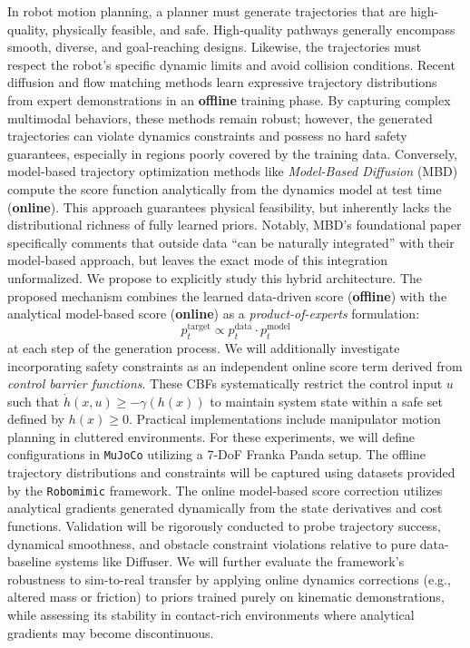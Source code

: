 \documentclass[letterpaper, 10 pt, conference]{ieeeconf}  %
\begin{document}
In robot motion planning, a planner must generate trajectories that are high-quality, physically feasible, and safe. High-quality pathways generally encompass smooth, diverse, and goal-reaching designs. Likewise, the trajectories must respect the robot's specific dynamic limits and avoid collision conditions. Recent diffusion and flow matching methods learn expressive trajectory distributions from expert demonstrations in an \textbf{offline} training phase. By capturing complex multimodal behaviors, these methods remain robust; however, the generated trajectories can violate dynamics constraints and possess no hard safety guarantees, especially in regions poorly covered by the training data. Conversely, model-based trajectory optimization methods like \textit{Model-Based Diffusion} (MBD) \cite{mbd} compute the score function analytically from the dynamics model at test time (\textbf{online}). This approach guarantees physical feasibility, but inherently lacks the distributional richness of fully learned priors. Notably, MBD's foundational paper specifically comments that outside data ``can be naturally integrated'' with their model-based approach, but leaves the exact mode of this integration unformalized. We propose to explicitly study this hybrid architecture. The proposed mechanism combines the learned data-driven score (\textbf{offline}) with the analytical model-based score (\textbf{online}) as a \textit{product-of-experts} formulation:
$$
    p^{\mathrm{target}}_t \propto p^{\mathrm{data}}_t \cdot p^{\mathrm{model}}_t
$$
at each step of the generation process. We will additionally investigate incorporating safety constraints as an independent online score term derived from \textit{control barrier functions}. These CBFs systematically restrict the control input $u$ such that $\dot{h}(x, u) \ge -\gamma(h(x))$ to maintain system state within a safe set defined by $h(x) \ge 0$. Practical implementations include manipulator motion planning in cluttered environments. For these experiments, we will define configurations in \texttt{MuJoCo} utilizing a 7-DoF Franka Panda setup. The offline trajectory distributions and constraints will be captured using datasets provided by the \texttt{Robomimic} framework. The online model-based score correction utilizes analytical gradients generated dynamically from the state derivatives and cost functions. Validation will be rigorously conducted to probe trajectory success, dynamical smoothness, and obstacle constraint violations relative to pure data-baseline systems like Diffuser. We will further evaluate the framework's robustness to sim-to-real transfer by applying online dynamics corrections (e.g., altered mass or friction) to priors trained purely on kinematic demonstrations, while assessing its stability in contact-rich environments where analytical gradients may become discontinuous.
\end{document}
